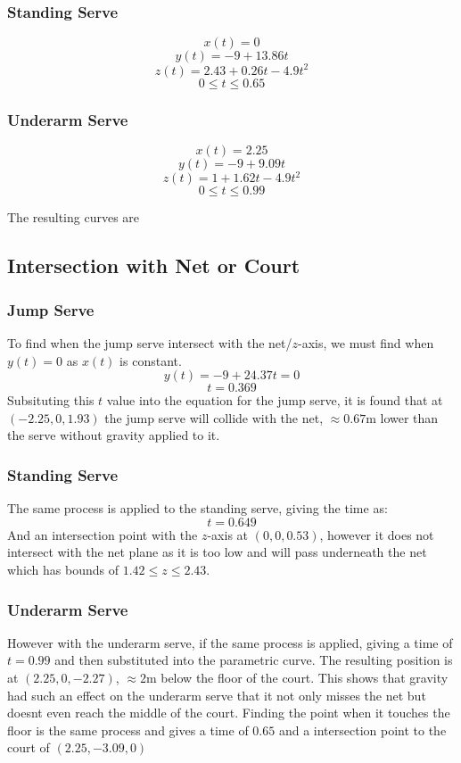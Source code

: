 \documentclass{article}
\begin{document}
													\subsubsection*{Standing Serve}
													\[ x(t) = 0 \]
													\[ y(t) = -9 + 13.86t\]
													\[ z(t) = 2.43 + 0.26t -4.9t^{2}\]
													\[0 \le t \le 0.65\]

													\subsubsection*{Underarm Serve}
													\[ x(t) = 2.25 \]
													\[ y(t) = -9 + 9.09t \]
													\[ z(t) = 1 + 1.62t - 4.9t^{2}\]
													\[0 \le t \le 0.99\]

													The resulting curves are 

													\subsection*{Intersection with Net or Court}

													\subsubsection*{Jump Serve}
													To find when the jump serve intersect with the net/\(z\)-axis, we must find when \(y(t) = 0\) as \(x(t)\) is constant. 
													\[y(t) = -9 + 24.37t = 0\]
													\[t = 0.369\]
													Subsituting this \(t\) value into the equation for the jump serve, it is found that at \((-2.25, 0, 1.93)\) the jump serve will collide with the net, \(\approx 0.67\)m lower than the serve without gravity applied to it. 

													\subsubsection*{Standing Serve}
													The same process is applied to the standing serve, giving the time as:
													\[t = 0.649\]
													And an intersection point with the \(z\)-axis at \((0, 0, 0.53)\), however it does not intersect with the net plane as it is too low and will pass underneath the net which has bounds of \(1.42 \le z \le 2.43\).

													\subsubsection*{Underarm Serve}
													However with the underarm serve, if the same process is applied, giving a time of \(t = 0.99\) and then substituted into the parametric curve. The resulting position is at \((2.25, 0, -2.27)\), \(\approx 2\)m below the floor of the court. This shows that gravity had such an effect on the underarm serve that it not only misses the net but doesnt even reach the middle of the court. Finding the point when it touches the floor is the same process and gives a time of \(0.65\) and a intersection point to the court of \((2.25, -3.09, 0)\) \vspace{15pt}
\end{document}
